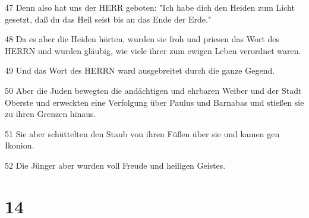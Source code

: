 \par 47 Denn also hat uns der HERR geboten: "Ich habe dich den Heiden zum Licht gesetzt, daß du das Heil seist bis an das Ende der Erde."
\par 48 Da es aber die Heiden hörten, wurden sie froh und priesen das Wort des HERRN und wurden gläubig, wie viele ihrer zum ewigen Leben verordnet waren.
\par 49 Und das Wort des HERRN ward ausgebreitet durch die ganze Gegend.
\par 50 Aber die Juden bewegten die andächtigen und ehrbaren Weiber und der Stadt Oberste und erweckten eine Verfolgung über Paulus und Barnabas und stießen sie zu ihren Grenzen hinaus.
\par 51 Sie aber schüttelten den Staub von ihren Füßen über sie und kamen gen Ikonion.
\par 52 Die Jünger aber wurden voll Freude und heiligen Geistes.

\chapter{14}

